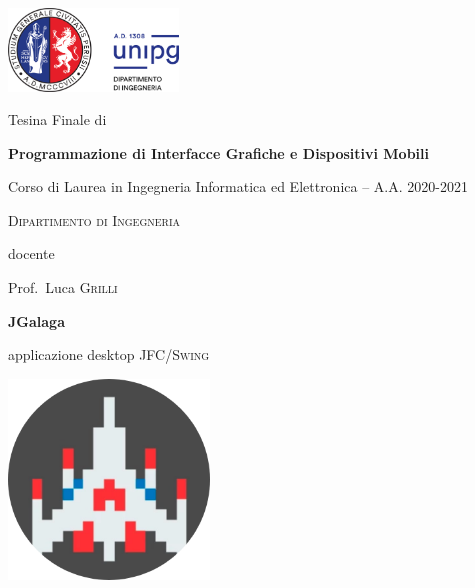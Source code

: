\documentclass[12pt,a4paper]{report}
\begin{document}
\begin{titlepage}
	\centering
	\includegraphics[width=0.34\textwidth]{logo-unipg}\par\vspace{1cm}
	\large{Tesina Finale di}\par
	\large{\textbf{Programmazione di Interfacce Grafiche e Dispositivi Mobili}}\par
	\small{Corso di Laurea in Ingegneria Informatica ed Elettronica -- A.A. 2020-2021}\par
	\textsc{\small{Dipartimento di Ingegneria}}\par

	\vspace{0.5cm}
	docente\par
	Prof.~Luca \textsc{Grilli}

	\vspace{1cm}
	\vspace{1cm}
	\textbf{\huge{JGalaga}}\par
	\vspace{0.2cm}
	applicazione desktop \textsc{JFC/Swing}\par
	\vspace{0.5cm}
	\includegraphics[width=0.40\textwidth]{circle-cropped-galaga}\par\vspace{1cm}
	\vspace{1cm}


\end{titlepage}
\end{document}

